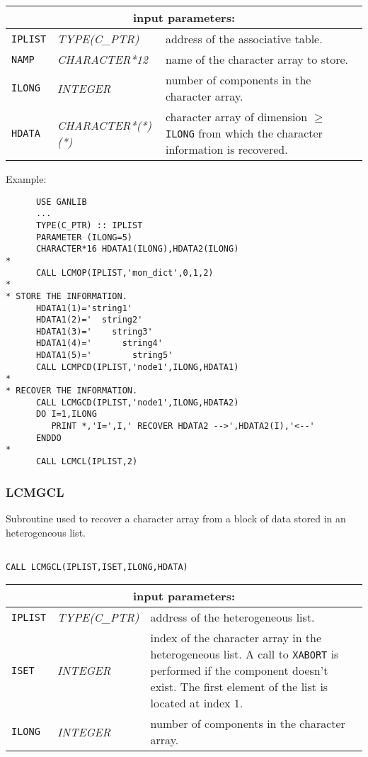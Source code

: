 \noindent
\begin{tabular}{|p{1.5cm}|p{3.5cm}|p{9.5cm}|}
\hline
\multicolumn{3}{|c|}{\bf input parameters:} \\
\hline
{\tt IPLIST} & {\it TYPE(C\_PTR)} & address of the associative table. \\
\hline
{\tt NAMP} & {\it CHARACTER*12} & name of the character array
to store. \\
\hline
{\tt ILONG} & {\it INTEGER} & number of components in the character array.\\
\hline
{\tt HDATA} & {\it CHARACTER*(*)(*)} & character array of dimension $\ge$ {\tt ILONG} from which the character information is recovered. \\
\hline
\end{tabular}

\vskip 0.4cm

\noindent Example:
\begin{verbatim}
      USE GANLIB
      ...
      TYPE(C_PTR) :: IPLIST
      PARAMETER (ILONG=5)
      CHARACTER*16 HDATA1(ILONG),HDATA2(ILONG)
*
      CALL LCMOP(IPLIST,'mon_dict',0,1,2)
*
* STORE THE INFORMATION.
      HDATA1(1)='string1'
      HDATA1(2)='  string2'
      HDATA1(3)='    string3'
      HDATA1(4)='      string4'
      HDATA1(5)='        string5'
      CALL LCMPCD(IPLIST,'node1',ILONG,HDATA1)
*
* RECOVER THE INFORMATION.
      CALL LCMGCD(IPLIST,'node1',ILONG,HDATA2)
      DO I=1,ILONG
         PRINT *,'I=',I,' RECOVER HDATA2 -->',HDATA2(I),'<--'
      ENDDO
*
      CALL LCMCL(IPLIST,2)
\end{verbatim}

\subsubsection{LCMGCL}\label{sect:LCMGCL}

Subroutine used to recover a character array from a block of data stored in an heterogeneous list.

\begin{verbatim}

CALL LCMGCL(IPLIST,ISET,ILONG,HDATA)
\end{verbatim}

\noindent
\begin{tabular}{|p{1.5cm}|p{3cm}|p{10cm}|}
\hline
\multicolumn{3}{|c|}{\bf input parameters:} \\
\hline
{\tt IPLIST} & {\it TYPE(C\_PTR)} & address of the heterogeneous list. \\
\hline
{\tt ISET} & {\it INTEGER} &  index of the character array in the heterogeneous list. A call to {\tt XABORT} is performed if the component doesn't exist.
The first element of the list is located at index $1$.\\
\hline
{\tt ILONG} & {\it INTEGER} & number of components in the character array.\\
\hline
\end{tabular}


